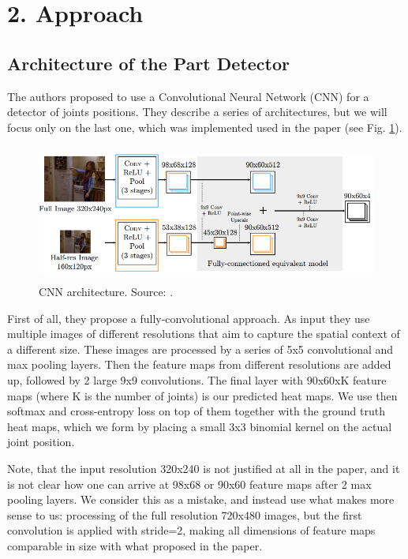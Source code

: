\documentclass[a4paper,10pt]{article}
\begin{document}
\section{2. Approach}
	\subsection{Architecture of the Part Detector}
	The authors proposed to use a Convolutional Neural Network (CNN) for a detector of joints positions. They describe a series of architectures, but we will focus only on the last one, which was implemented used in the paper (see Fig. \ref{cnn_architecture}).
	\begin{figure}[H]
 		\includegraphics[height=4.5cm]{img/cnn_architecture.png}
		\caption{CNN architecture. Source: \cite{cnn_pgm_for_hpe}.}
		\label{cnn_architecture}
	\end{figure}
	First of all, they propose a fully-convolutional approach. As input they use multiple images of different resolutions that aim to capture the spatial context of a different size. These images are processed by a series of 5x5 convolutional and max pooling layers. Then the feature maps from different resolutions are added up, followed by 2 large 9x9 convolutions. The final layer with 90x60xK feature maps (where K is the number of joints) is our predicted heat maps. We use then softmax and cross-entropy loss on top of them together with the ground truth heat maps, which we form by placing a small 3x3 binomial kernel on the actual joint position. 
	
	Note, that the input resolution 320x240 is not justified at all in the paper, and it is not clear how one can arrive at 98x68 or 90x60 feature maps after 2 max pooling layers. We consider this as a mistake, and instead use what makes more sense to us: processing of the full resolution 720x480 images, but the first convolution is applied with stride=2, making all dimensions of feature maps comparable in size with what proposed in the paper.
	
\end{document}
